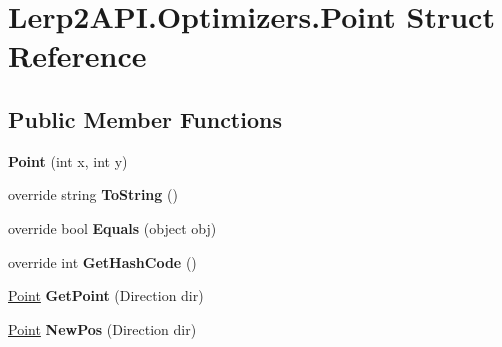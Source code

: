 \hypertarget{struct_lerp2_a_p_i_1_1_optimizers_1_1_point}{}\section{Lerp2\+A\+P\+I.\+Optimizers.\+Point Struct Reference}
\label{struct_lerp2_a_p_i_1_1_optimizers_1_1_point}
\subsection*{Public Member Functions}
\begin{DoxyCompactItemize}
\item 
\mbox{\label{struct_lerp2_a_p_i_1_1_optimizers_1_1_point_acbc8b93890fbb765ae1d9cab6027068e}} 
{\bfseries Point} (int x, int y)
\item 
\mbox{\label{struct_lerp2_a_p_i_1_1_optimizers_1_1_point_a9e5608f09142f6e9ed1c8f29d0c7b78e}} 
override string {\bfseries To\+String} ()
\item 
\mbox{\label{struct_lerp2_a_p_i_1_1_optimizers_1_1_point_a869dfe6b92fa685d7688724359a53160}} 
override bool {\bfseries Equals} (object obj)
\item 
\mbox{\label{struct_lerp2_a_p_i_1_1_optimizers_1_1_point_a591668a0f9a19a0c1bc1ee86894d07cf}} 
override int {\bfseries Get\+Hash\+Code} ()
\item 
\mbox{\label{struct_lerp2_a_p_i_1_1_optimizers_1_1_point_aad820f00fe3f7401e98d38965e51f3a3}} 
\hyperlink{struct_lerp2_a_p_i_1_1_optimizers_1_1_point}{Point} {\bfseries Get\+Point} (Direction dir)
\item 
\mbox{\label{struct_lerp2_a_p_i_1_1_optimizers_1_1_point_aaa74bbc1982f994823c8caf9652eb829}} 
\hyperlink{struct_lerp2_a_p_i_1_1_optimizers_1_1_point}{Point} {\bfseries New\+Pos} (Direction dir)
\end{DoxyCompactItemize}
